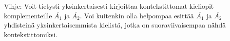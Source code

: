 \documentclass[a4paper,11pt]{article}
\newcommand{\set}[1]{{\left\{ #1 \right\}}}
\begin{document}
\begin{enumerate}
  Vihje: Voit tietysti yksinkertaisesti kirjoittaa kontekstittomat  kieliopit komplementeille $\overline{A_1}$ ja $\overline{A_2}$. Voi kuitenkin
  olla helpompaa esittää $\overline{A_1}$ ja $\overline{A_2}$ yhdisteinä yksinkertaisemmista kielistä, jotka on suoraviivaisempaa
  nähdä kontekstittomiksi.






\end{enumerate}
\end{document}
